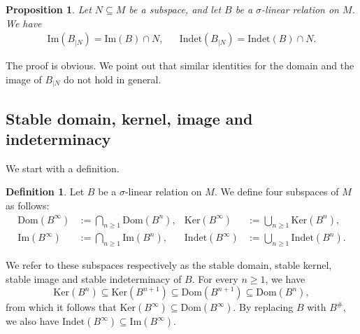 \documentclass[12pt]{amsart}
\newtheorem{proposition}[theorem]{Proposition}
\theoremstyle{definition}
\newtheorem{definition}[theorem]{Definition}
\newcommand{\<}{\langle}   %
\renewcommand{\>}{\rangle} %
\begin{document}
\begin{proposition}
    Let $N \subseteq  M$ be a subspace, and let $B$ be a $\sigma$-linear relation on $M$. We have 
    \begin{align*}
        \mathrm{Im}(B_{|N}) = \mathrm{Im}(B) \cap N, & & \mathrm{Indet}(B_{|N}) = \mathrm{Indet}(B) \cap N.
    \end{align*}
\end{proposition}

The proof is obvious. We point out that similar identities for the domain and the image of $B_{|N}$ do not hold in general.

\subsection{Stable domain, kernel, image and indeterminacy}

We start with a definition.

\begin{definition}\label{DefStableSubspaces}
    Let $B$ be a $\sigma$-linear relation on $M$. We define four subspaces of $M$ as follows:
    \begin{align*}
        \mathrm{Dom}(B^{\infty}) & := \bigcap_{n\geq 1} \mathrm{Dom}(B^n), & \mathrm{Ker}(B^{\infty}) & := \bigcup_{n\geq 1} \mathrm{Ker}(B^n),\\
        \mathrm{Im}(B^{\infty}) & := \bigcap_{n\geq 1} \mathrm{Im}(B^n), & \mathrm{Indet}(B^{\infty}) & := \bigcup_{n\geq 1} \mathrm{Indet}(B^n).
    \end{align*}
\end{definition}

We refer to these subspaces respectively as the stable domain, stable kernel, stable image and stable indeterminacy of $B$. For every $n\geq 1$, we have 
\begin{equation*}
    \mathrm{Ker}(B^n) \subseteq  \mathrm{Ker}(B^{n+1}) \subseteq  \mathrm{Dom}(B^{n+1}) \subseteq  \mathrm{Dom}(B^n),
\end{equation*}
from which it follows that $\mathrm{Ker}(B^{\infty}) \subseteq  \mathrm{Dom}(B^{\infty})$. By replacing $B$ with $B^{\#}$, we also have $\mathrm{Indet}(B^{\infty}) \subseteq  \mathrm{Im}(B^{\infty})$.
\end{document}
